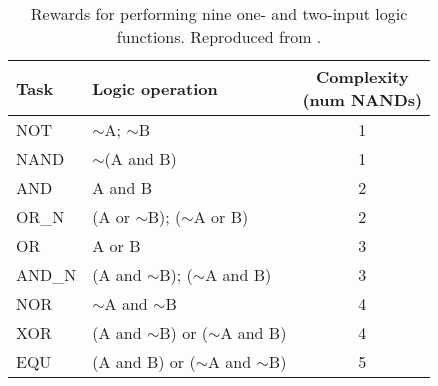 \begin{table}[h]
\centering
\caption{Rewards for performing nine one- and two-input logic functions. Reproduced from \citep{lenski2003evolutionary}.}
\begin{tabular}{llc}
\hline
Task & Logic operation & \makecell{Complexity\\(num NANDs)} \\
\hline
NOT & $\sim$A; $\sim$B & 1 \\
NAND & $\sim$(A and B) & 1 \\
AND & A and B & 2 \\
OR\_N & (A or $\sim$B); ($\sim$A or B) & 2 \\
OR & A or B & 3 \\
AND\_N & (A and $\sim$B); ($\sim$A and B) & 3 \\
NOR & $\sim$A and $\sim$B & 4 \\
XOR & (A and $\sim$B) or ($\sim$A and B) & 4 \\
EQU & (A and B) or ($\sim$A and $\sim$B) & 5 \\
\hline
\end{tabular}
\end{table}
